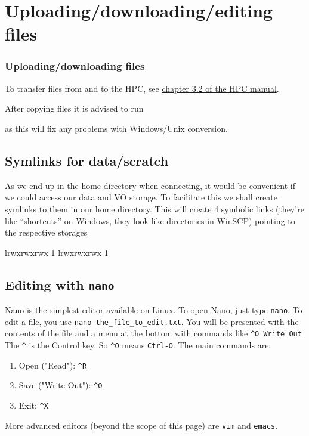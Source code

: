 \chapter{Uploading/downloading/editing files}

\subsection{Uploading/downloading files}

To transfer files from and to the HPC, see
\href{\HPCManualURL}{chapter 3.2 of the HPC manual}.

\ifwindows

After copying files it is advised to run

\begin{prompt}
\end{prompt}

as this will fix any problems with Windows/Unix conversion.

\fi
\section{Symlinks for data/scratch}

As we end up in the home directory when connecting, it would be convenient if we
could access our data and VO storage. To facilitate this we shall create
symlinks to them in our home directory. This will create 4 symbolic links
\ifwindows(they're like ``shortcuts'' on Windows, they look like directories in WinSCP) \fi
pointing to the respective storages

\begin{prompt}
lrwxrwxrwx 1 %
lrwxrwxrwx 1 %
\end{prompt}

\section{Editing with \verb|nano|}

Nano is the simplest editor available on Linux. To open Nano, just type
\verb|nano|. To edit a file, you use \verb|nano the_file_to_edit.txt|. You will
be presented with the contents of the file and a menu at the bottom with
commands like \verb|^O Write Out| The \verb|^| is the Control key. So \verb|^O| means
\verb|Ctrl-O|. The main commands are:

\begin{enumerate}
\item Open ("Read"): \verb|^R|
\item Save ("Write Out"): \verb|^O|
\item Exit: \verb|^X|
\end{enumerate}

More advanced editors (beyond the scope of this page) are \verb|vim| and \verb|emacs|.
